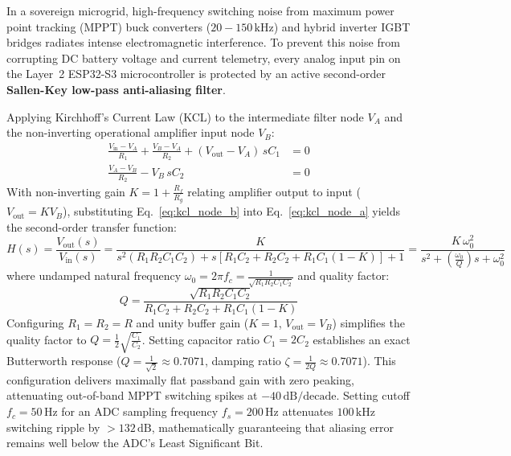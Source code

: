 In a sovereign microgrid, high-frequency switching noise from maximum power point tracking (MPPT) buck converters ($20 - 150\,\mathrm{kHz}$) and hybrid inverter IGBT bridges radiates intense electromagnetic interference. To prevent this noise from corrupting DC battery voltage and current telemetry, every analog input pin on the Layer~2 ESP32-S3 microcontroller is protected by an active second-order \textbf{Sallen-Key low-pass anti-aliasing filter}.

Applying Kirchhoff's Current Law (KCL) to the intermediate filter node $V_A$ and the non-inverting operational amplifier input node $V_B$:
\begin{align}
\frac{V_{\mathrm{in}} - V_A}{R_1} + \frac{V_B - V_A}{R_2} + (V_{\mathrm{out}} - V_A) \, s C_1 &= 0 \label{eq:kcl_node_a} \\
\frac{V_A - V_B}{R_2} - V_B \, s C_2 &= 0 \label{eq:kcl_node_b}
\end{align}
With non-inverting gain $K = 1 + \frac{R_f}{R_g}$ relating amplifier output to input ($V_{\mathrm{out}} = K V_B$), substituting Eq.~\ref{eq:kcl_node_b} into Eq.~\ref{eq:kcl_node_a} yields the second-order transfer function:
\begin{equation}
H(s) = \frac{V_{\mathrm{out}}(s)}{V_{\mathrm{in}}(s)} = \frac{K}{s^2 \left( R_1 R_2 C_1 C_2 \right) + s \left[ R_1 C_2 + R_2 C_2 + R_1 C_1 (1 - K) \right] + 1} = \frac{K \, \omega_0^2}{s^2 + \left( \frac{\omega_0}{Q} \right) s + \omega_0^2}
\label{eq:sallen_key_tf}
\end{equation}
where undamped natural frequency $\omega_0 = 2\pi f_c = \frac{1}{\sqrt{R_1 R_2 C_1 C_2}}$ and quality factor:
\begin{equation}
Q = \frac{\sqrt{R_1 R_2 C_1 C_2}}{R_1 C_2 + R_2 C_2 + R_1 C_1 (1 - K)}
\label{eq:sallen_key_q}
\end{equation}
Configuring $R_1 = R_2 = R$ and unity buffer gain ($K = 1$, $V_{\mathrm{out}} = V_B$) simplifies the quality factor to $Q = \frac{1}{2}\sqrt{\frac{C_1}{C_2}}$. Setting capacitor ratio $C_1 = 2 C_2$ establishes an exact Butterworth response ($Q = \frac{1}{\sqrt{2}} \approx 0.7071$, damping ratio $\zeta = \frac{1}{2Q} \approx 0.7071$). This configuration delivers maximally flat passband gain with zero peaking, attenuating out-of-band MPPT switching spikes at $-40\,\mathrm{dB/decade}$. Setting cutoff $f_c = 50\,\mathrm{Hz}$ for an ADC sampling frequency $f_s = 200\,\mathrm{Hz}$ attenuates $100\,\mathrm{kHz}$ switching ripple by $>132\,\mathrm{dB}$, mathematically guaranteeing that aliasing error remains well below the ADC's Least Significant Bit.

